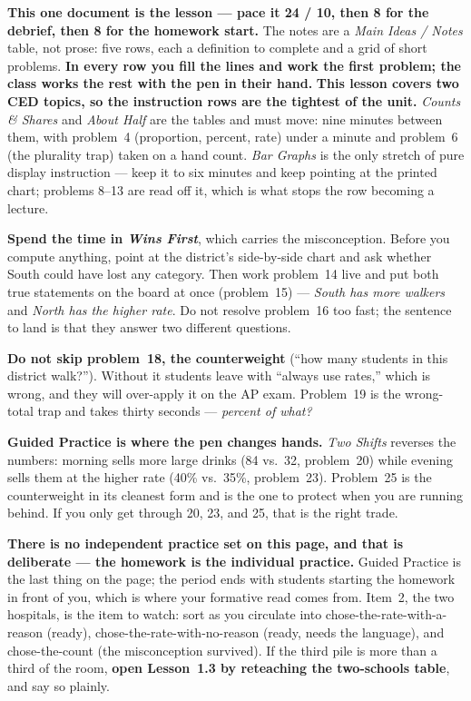 \documentclass[10pt]{article}
\begin{document}
\begin{teachernote}
\textbf{This one document is the lesson --- pace it 24 / 10, then 8 for the debrief, then 8 for
the homework start.} The notes are a \emph{Main Ideas / Notes} table, not prose: five rows, each
a definition to complete and a grid of short problems. \textbf{In every row you fill the lines
and work the first problem; the class works the rest with the pen in their hand.}
\textbf{This lesson covers two CED topics, so the instruction rows are the tightest of the
unit.} \emph{Counts \& Shares} and \emph{About Half} are the tables and must move: nine minutes
between them, with problem~4 (proportion, percent, rate) under a minute and problem~6 (the
plurality trap) taken on a hand count. \emph{Bar Graphs} is the only stretch of pure display
instruction --- keep it to six minutes and keep pointing at the printed chart; problems 8--13 are
read off it, which is what stops the row becoming a lecture.

\textbf{Spend the time in \emph{Wins First}}, which carries the misconception. Before you compute
anything, point at the district's side-by-side chart and ask whether South could have lost any
category. Then work problem~14 live and put both true statements on the board at once
(problem~15) --- \emph{South has more walkers} and \emph{North has the higher rate}. Do not
resolve problem~16 too fast; the sentence to land is that they answer two different questions.

\textbf{Do not skip problem~18, the counterweight} (``how many students in this district
walk?''). Without it students leave with ``always use rates,'' which is wrong, and they will
over-apply it on the AP exam. Problem~19 is the wrong-total trap and takes thirty seconds ---
\emph{percent of what?}

\textbf{Guided Practice is where the pen changes hands.} \emph{Two Shifts} reverses the numbers:
morning sells more large drinks (84 vs.\ 32, problem~20) while evening sells them at the higher
rate (40\% vs.\ 35\%, problem~23). Problem~25 is the counterweight in its cleanest form and is the
one to protect when you are running behind. If you only get through 20, 23, and 25, that is the
right trade.

\textbf{There is no independent practice set on this page, and that is deliberate --- the
homework is the individual practice.} Guided Practice is the last thing on the page; the period
ends with students starting the homework in front of you, which is where your formative read
comes from. Item~2, the two hospitals, is the item to watch: sort as you circulate into
chose-the-rate-with-a-reason (ready), chose-the-rate-with-no-reason (ready, needs the language),
and chose-the-count (the misconception survived). If the third pile is more than a third of the
room, \textbf{open Lesson~1.3 by reteaching the two-schools table}, and say so plainly.


\end{teachernote}
\end{document}
